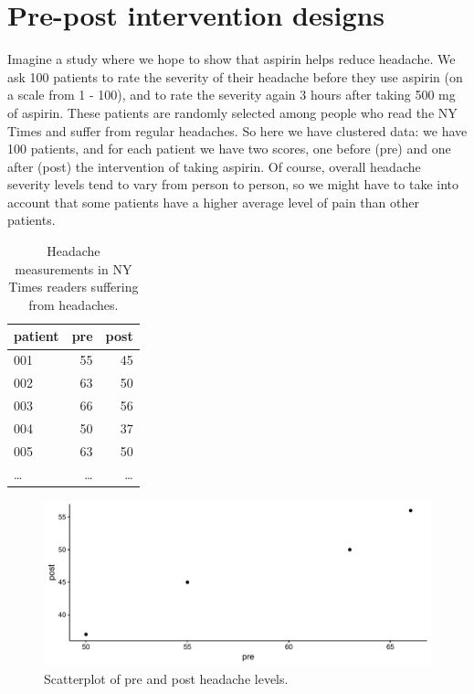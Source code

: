 \documentclass[]{book}\usepackage[]{graphicx}\usepackage[]{color}
\makeatletter
\def\maxwidth{ %
  \ifdim\Gin@nat@width>\linewidth
    \linewidth
  \else
    \Gin@nat@width
  \fi
}
\newenvironment{knitrout}{}{} %
\makeatother
\begin{document}
\section{Pre-post intervention designs}


Imagine a study where we hope to show that aspirin helps reduce headache. We ask 100 patients to rate the severity of their headache before they use aspirin (on a scale from 1 - 100), and to rate the severity again 3 hours after taking 500 mg of aspirin. These patients are randomly selected among people who read the NY Times and suffer from regular headaches. So here we have clustered data: we have 100 patients, and for each patient we have two scores, one before (pre) and one after (post) the intervention of taking aspirin. Of course, overall headache severity levels tend to vary from person to person, so we might have to take into account that some patients have a higher average level of pain than other patients. 
 
 
 \begin{table}
 \caption{Headache measurements in NY Times readers suffering from headaches.}
 \begin{tabular}{lrr}
 patient & pre & post \\ \hline
 001 & 55 & 45 \\
 002 & 63 & 50 \\
 003 & 66 & 56 \\
 004 & 50 & 37 \\
 005 & 63 & 50 \\
 \dots & \dots & \dots \\
 \end{tabular}
 \label{tab:headache_wide}
\end{table}

\begin{knitrout}
\color{fgcolor}\begin{figure}

{\centering \includegraphics[width=\maxwidth]{figure/analysisprepost1a-1} 

}

\caption[Scatterplot of pre and post headache levels]{Scatterplot of pre and post headache levels.}\label{fig:analysisprepost1a}
\end{figure}


\end{knitrout}
\end{document}

